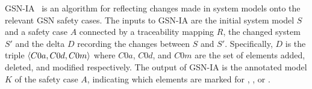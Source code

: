 %	
%
%
%
%

GSN-IA~\cite{Kokaly:2017} is an algorithm for reflecting changes made in system models onto the relevant GSN safety cases. %
The inputs to GSN-IA are the initial system model $S$
and a safety case $A$ connected by a traceability mapping $R$, the
changed system $S'$ and the delta $D$ recording the changes between
$S$ and $S'$. Specifically, $D$ is the triple $\langle C0a, C0d, C0m \rangle$ where $C0a$, $C0d$, and $C0m$ are the 
set of elements added, deleted, and modified respectively.
The output of GSN-IA is the annotated model $K$ of the safety case $A$, indicating which elements are marked for ,
, or .

